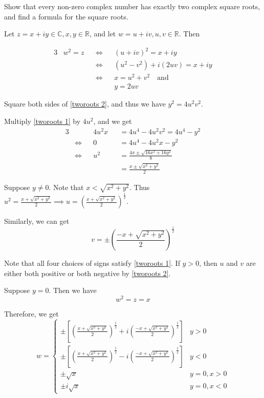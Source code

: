 \documentclass[notoc,notitlepage]{tufte-book}
\begin{document}
\begin{eg}
	\label{eg:complex number has exactly two roots}
	Show that every non-zero complex number has exactly two complex square roots, and find a formula for the square roots.

	Let $z = x + iy \in \mathbb{C}, x, y \in \mathbb{R}$, and let $w = u + iv, u, v \in \mathbb{R}$. Then

	\begin{alignat}{3}
		&w^2 = z &&\iff && (u + iv)^2 = x + iy \nonumber \\
		&	&&\iff 	&& (u^2 - v^2) + i(2uv) = x + iy \nonumber \\
		&	&&\iff && x = u^2 + v^2 \quad \text{and} \label{tworoots 1} \\
		&	&&	   && y = 2uv \label{tworoots 2}
	\end{alignat}

	Square both sides of \cref{tworoots 2}, and thus we have $y^2 = 4u^2 v^2$.

	Multiply \cref{tworoots 1} by $4u^2$, and we get
	\begin{alignat*}{3}
		& 	  &&4u^2 x &&= 4u^4 - 4u^2 v^2 = 4u^4 - y^2 \\
		&\iff &&0 	&&= 4u^4 - 4u^2 x - y^2 \\
		&\iff &&u^2 &&= \frac{4x \pm \sqrt{16x^2 + 16y^2}}{8} \\
		&	  &&	&&= \frac{x \pm \sqrt{x^2 + y^2}}{2} 
	\end{alignat*}

	Suppose $y \neq 0$. Note that $x < \sqrt{x^2 + y^2}$. Thus $u^2 = \frac{x + \sqrt{x^2 + y^2}}{2} \implies u = \left(\frac{x + \sqrt{x^2 + y^2}}{2} \right)^{\frac{1}{2}}$.

	Similarly, we can get
	\begin{equation*}
		v = \pm \left(\frac{-x + \sqrt{x^2 + y^2}}{2}\right)^{\frac{1}{2}}
	\end{equation*}

	Note that all four choices of signs satisfy \cref{tworoots 1}. If $y > 0$, then $u$ and $v$ are either both positive or both negative by \cref{tworoots 2}.

	Suppose $y = 0$. Then we have
	\begin{equation*}
		w^2 = z = x
	\end{equation*}

	Therefore, we get
	\begin{equation*}
		w = \begin{cases}
			\pm \left[ \left(\frac{x + \sqrt{x^2 + y^2}}{2} \right)^{\frac{1}{2}} + i \left( \frac{-x + \sqrt{x^2 + y^2}}{2} \right)^{\frac{1}{2}} \right] & y > 0 \\
			\pm \left[ \left(\frac{x + \sqrt{x^2 + y^2}}{2} \right)^{\frac{1}{2}} - i \left(\frac{-x + \sqrt{x^2 + y^2}}{2} \right)^{\frac{1}{2}} \right] & y < 0 \\
			\pm \sqrt{x} & y = 0, x > 0 \\
			\pm i \sqrt{x} & y = 0, x < 0
		\end{cases}
	\end{equation*}
\end{eg}
\end{document}
